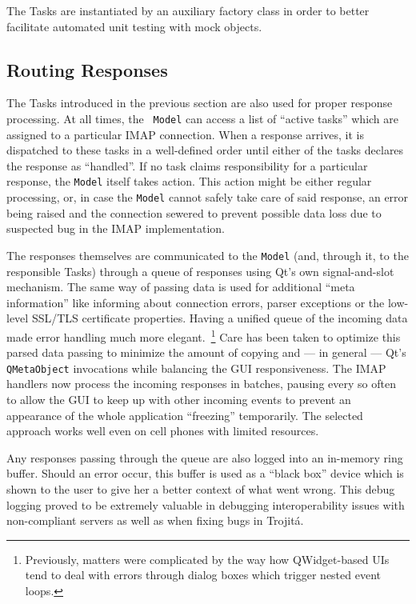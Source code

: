 \documentclass[trojita]{subfiles}
\begin{document}
The Tasks are instantiated by an auxiliary factory class in order to better facilitate automated unit testing with
mock objects.

\subsection{Routing Responses}

The Tasks introduced in the previous section are also used for proper response processing.  At all times, the {\tt
Model} can access a list of ``active tasks'' which are assigned to a particular IMAP connection.  When a response
arrives, it is dispatched to these tasks in a well-defined order until either of the tasks declares the response as
``handled''.  If no task claims responsibility for a particular response, the {\tt Model} itself takes action.  This
action might be either regular processing, or, in case the {\tt Model} cannot safely take care of said response, an
error being raised and the connection sewered to prevent possible data loss due to suspected bug in the IMAP
implementation.

The responses themselves are communicated to the {\tt Model} (and, through it, to the responsible Tasks) through a queue
of responses using Qt's own signal-and-slot mechanism.  The same way of passing data is used for additional
``meta information'' like informing about connection errors, parser exceptions or the low-level SSL/TLS certificate
properties.  Having a unified queue of the incoming data made error handling much more elegant.~\footnote{Previously,
matters were complicated by the way how QWidget-based UIs tend to deal with errors through dialog boxes which trigger
nested event loops.}  Care has been taken to optimize this parsed data passing to minimize the amount of copying and ---
in general --- Qt's {\tt QMetaObject} invocations while balancing the GUI responsiveness.  The IMAP handlers now process
the incoming responses in batches, pausing every so often to allow the GUI to keep up with other incoming events to
prevent an appearance of the whole application ``freezing'' temporarily.  The selected approach works well even on cell
phones with limited resources.

Any responses passing through the queue are also logged into an in-memory ring buffer.  Should an error occur, this
buffer is used as a ``black box'' device which is shown to the user to give her a better context of what went wrong.
This debug logging proved to be extremely valuable in debugging interoperability issues with non-compliant servers as
well as when fixing bugs in Trojitá.
\end{document}
